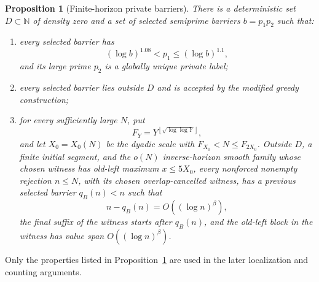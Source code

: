 \documentclass[11pt]{article}
\newtheorem{proposition}[theorem]{Proposition}
\theoremstyle{definition}
\newcommand{\N}{\mathbb N}
\newcommand{\floor}[1]{\left\lfloor #1\right\rfloor}
\newcommand{\1}{\mathbf 1}
\begin{document}
\begin{proposition}[Finite-horizon private barriers]\label{prop:barriers}
There is a deterministic set \(D\subset\N\) of density zero and a set of
selected semiprime barriers \(b=p_1p_2\) such that:
\begin{enumerate}[label=(\roman*)]
\item every selected barrier has
\[
  (\log b)^{1.08}<p_1\le(\log b)^{1.1},
\]
and its large prime \(p_2\) is a globally unique private label;
\item every selected barrier lies outside \(D\) and is accepted by the
modified greedy construction;
\item for every sufficiently large \(N\), put
\[
  F_Y=Y^{\floor{\sqrt{\log\log Y}}},
\]
and let \(X_0=X_0(N)\) be the dyadic scale with
\(F_{X_0}<N\le F_{2X_0}\).  Outside \(D\), a finite initial segment, and the
\(o(N)\) inverse-horizon smooth family whose chosen witness has old-left
maximum \(x\le5X_0\), every nonforced nonempty rejection \(n\le N\), with its
chosen overlap-cancelled witness, has a previous selected barrier \(q_B(n)<n\)
such that
\[
  n-q_B(n)=O((\log n)^\beta),
\]
the final suffix of the witness starts after \(q_B(n)\), and the old-left
block in the witness has value span \(O((\log n)^\beta)\).
\end{enumerate}
\end{proposition}

Only the properties listed in Proposition~\ref{prop:barriers} are used in the
later localization and counting arguments.
\end{document}
